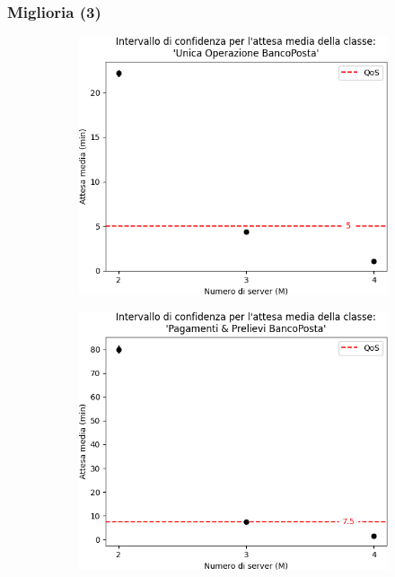 \documentclass[
	usepdftitle=false,
	xcolor={table, dvipsnames},
	hyperref={
		pdftitle={Studio delle prestazioni di un Ufficio Postale ispirato a Poste Italiane},
    	pdfauthor={A. Chillotti, C. Cuffaro e S. Tiberi}
    }
]{beamer}
\begin{document}
\begin{frame}
\frametitle{Miglioria (3)}
\begin{figure}[ht]
\centering
\begin{subfigure}[b]{0.3\textwidth}
\centering
\includegraphics[width=\textwidth]{plots/d0-trans-imp}
\end{subfigure}    
\begin{subfigure}[b]{0.3\textwidth}  
\centering 
\includegraphics[width=\textwidth]{plots/d1-trans-imp}
\end{subfigure}

\end{figure}
\end{frame}
\end{document}
